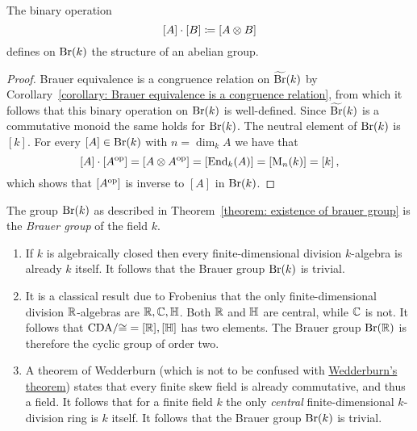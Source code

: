 

\begin{theorem}
  \label{theorem: existence of brauer group}
  The binary operation
  \[
              [A] \cdot [B]
    \coloneqq  [A \otimes B]
  \]
  defines on $\operatorname{Br}(k)$ the structure of an abelian group.
\end{theorem}


\begin{proof}
  Brauer equivalence is a congruence relation on $\widetilde{\operatorname{Br}}(k)$ by Corollary~\ref{corollary: Brauer equivalence is a congruence relation}, from which it follows that this binary operation on $\operatorname{Br}(k)$ is well-defined.
  Since $\widetilde{\operatorname{Br}}(k)$ is a commutative monoid the same holds for $\operatorname{Br}(k)$.
  The neutral element of $\operatorname{Br}(k)$ is $[k]$.
  For every $[A] \in \operatorname{Br}(k)$ with $n = \dim_k A$ we have that
  \[
      [A] \cdot [A^{\mathrm{op}}]
    = [A \otimes A^{\mathrm{op}}]
    = [\operatorname{End}_k(A)]
    = [\operatorname{M}_n(k)]
    = [k] \,,
  \]
  which shows that $[A^{\mathrm{op}}]$ is inverse to $[A]$ in $\operatorname{Br}(k)$.
\end{proof}


\begin{definition}
  The group $\operatorname{Br}(k)$ as described in Theorem~\ref{theorem: existence of brauer group} is the \emph{Brauer group} of the field $k$.
\end{definition}


\begin{example}
  \leavevmode
  \begin{enumerate}
    \item
      If $k$ is algebraically closed then every finite-dimensional division $k$-algebra is already $k$ itself.
      It follows that the Brauer group $\operatorname{Br}(k)$ is trivial.
    \item
      It is a classical result due to Frobenius that the only finite-dimensional division $\mathbb{R}$-algebras are $\mathbb{R}, \mathbb{C}, \mathbb{H}$.
      Both $\mathbb{R}$ and $\mathbb{H}$ are central, while $\mathbb{C}$ is not.
      It follows that $\operatorname{CDA}\!/{\cong} = {[\mathbb{R}], [\mathbb{H}]}$ has two elements.
      The Brauer group $\operatorname{Br}(\mathbb{R})$ is therefore the cyclic group of order two.
    \item
      A theorem of Wedderburn (which is not to be confused with \hyperref[theorem: wedderburns theorem]{Wedderburn’s theorem}) states that every finite skew field is already commutative, and thus a field.
      It follows that for a finite field $k$ the only \emph{central} finite-dimensional $k$-division ring is $k$ itself.
      It follows that the Brauer group $\operatorname{Br}(k)$ is trivial.
  \end{enumerate}
\end{example}




